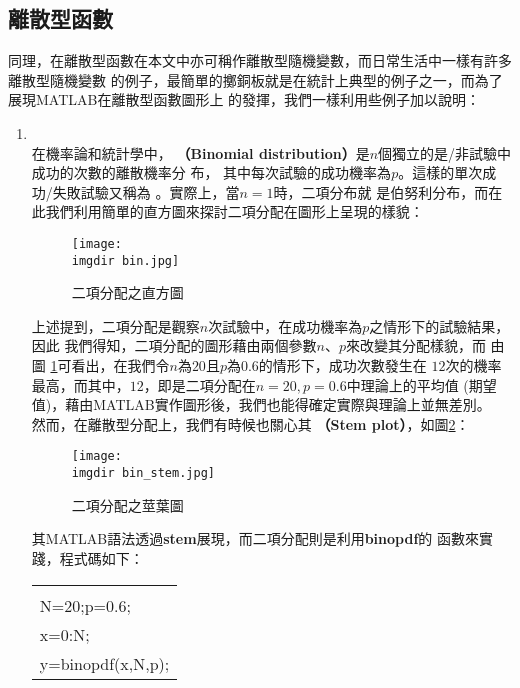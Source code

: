 		\subsection{離散型函數}
			同理，在離散型函數在本文中亦可稱作離散型隨機變數，而日常生活中一樣有許多離散型隨機變數				的例子，最簡單的擲銅板就是在統計上典型的例子之一，而為了展現MATLAB在離散型函數圖形上				的發揮，我們一樣利用些例子加以說明：
			\begin{enumerate}
				\item{\textbf{}\\	
					在機率論和統計學中，\textbf{\color{darkblue}{二項分布}										（Binomial distribution）}是$n$個獨立的是/非試驗中成功的次數的離散機率分						布，	其中每次試驗的成功機率為$p$。這樣的單次成功/失敗試驗又稱為									\textbf{\color{darkblue}{伯努利試驗}}。實際上，當$n = 1$時，二項分布就						是伯努利分布，而在此我們利用簡單的直方圖來探討二項分配在圖形上呈現的樣貌：
					\begin{figure}[H]	
		 		 		\centering	 			 	 
   				 		\texttt{[image: \\imgdir bin.jpg]} 
   			 			\caption{二項分配之直方圖}   		
   			 			\label{bin}   			 		 
					\end{figure}
					上述提到，二項分配是觀察$n$次試驗中，在成功機率為$p$之情形下的試驗結果，因此						我們得知，二項分配的圖形藉由兩個參數$n$、$p$來改變其分配樣貌，而	由圖								\ref{bin}可看出，在我們令$n$為$20$且$p$為$0.6$的情形下，成功次數發生在							$12$次的機率最高，而其中，$12$，即是二項分配在$n=20,p=0.6$中理論上的平均值						(期望值)，藉由MATLAB實作圖形後，我們也能得確定實際與理論上並無差別。
					\\
					然而，在離散型分配上，我們有時候也關心其\textbf{\color{darkblue}{莖葉圖}						（Stem plot）}，如圖\ref{bin_stem}：
					\begin{figure}[H]	
		 		 		\centering	 			 	 
   				 		\texttt{[image: \\imgdir bin\_stem.jpg]} 
   			 			\caption{二項分配之莖葉圖}   		
   			 			\label{bin_stem}   			 		 
					\end{figure}
					其MATLAB語法透過\textbf{stem}展現，而二項分配則是利用\textbf{binopdf}的						函數來實踐，程式碼如下：
					\begin{center}\colorbox{slight}{
						\begin{tabular}{p{}}
							\MJHmarker{\textbf{\color{darkblue}{MATLAB語法 :}}}\\		
							N=20;p=0.6;\\
							x=0:N;\\
							y=binopdf(x,N,p);\\

\end{tabular}}
\end{center}}
\end{enumerate}

